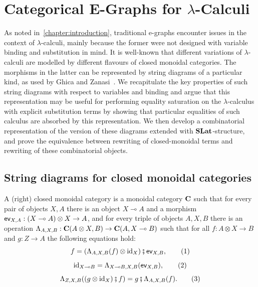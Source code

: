 \chapter{Categorical E-Graphs for \texorpdfstring{$\lambda$}{lambda}-Calculi}
\label{chapter:lambda}

As noted in~\cref{chapter:introduction}, traditional e-graphs encounter issues in the context of $\lambda$-calculi, mainly because the former were not designed with variable binding and substitution in mind.
It is well-known that different variations of $\lambda$-calculi are modelled by different flavours of closed monoidal categories.
The morphisms in the latter can be represented by string diagrams of a particular kind, as used by Ghica and Zanasi~\cite{ghica2024stringdiagramslambdacalculifunctional}.
We recapitulate the key properties of such string diagrams with respect to variables and binding and argue that this representation may be useful for performing equality saturation on the $\lambda$-calculus with explicit substitution terms by showing that particular equalities of such calculus are absorbed by this representation. 
We then develop a combinatorial representation of the version of these diagrams extended with $\mathbf{SLat}$-structure, and prove the equivalence between rewriting of closed-monoidal terms and rewriting of these combinatorial objects.

\section{String diagrams for closed monoidal categories}
\begin{definition}%
	\label{def:closed}
	A (right) closed monoidal category is a monoidal category $\mathbf{C}$ such that for
	every pair of objects $X,A$ there is an object $X \multimap A$ and a morphism $\operatorname{\textsf{ev}}_{X,A} : (X \multimap A) \otimes X \to
		A$, and for every triple of objects $A,X,B$ there is an operation $\Lambda_{A,X,B} : \mathbf{C}(A \otimes X,B) \to
		\mathbf{C}(A,X \multimap{} B)$ such that for all $f : A \otimes X \to B$ and $g : Z \to A$ the following equations hold:
	\begin{equation}
		f = (\Lambda_{A,X,B}(f) \otimes \operatorname{id}_{X}) \fatsemi \operatorname{\textsf{ev}}_{X,B},
  \label{eq:lambda_1}
  \tag{1}
  \end{equation}
  \begin{equation}
		\operatorname{id}_{X \multimap{} B} = \Lambda_{X \multimap{} B,X,B}(\operatorname{\textsf{ev}}_{X,B}),
  \label{eq:lambda_2}
  \tag{2}
  \end{equation}
  \begin{equation}
		\Lambda_{Z,X,B}((g \otimes \operatorname{id}_{X}) \fatsemi f) = g \fatsemi \Lambda_{A,X,B}(f).
  \label{eq:lambda_3}
  \tag{3}
  \end{equation}
\end{definition}

